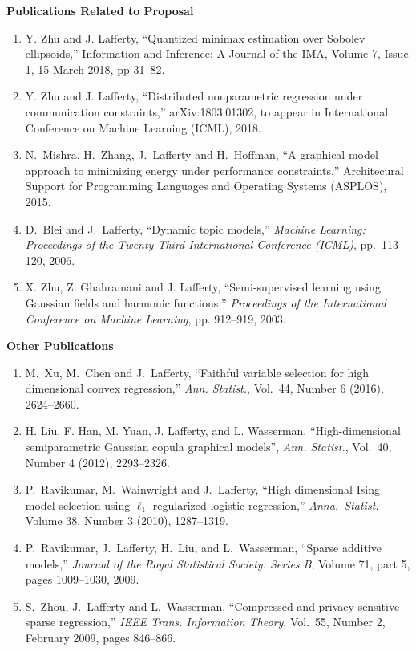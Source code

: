 \documentclass[pdftex,12pt]{article}
\begin{document}
\def\secskip{\vskip6pt}

\secskip{\bf Publications Related to Proposal}
\begin{enumerate}

\item Y. Zhu  and J. Lafferty, ``Quantized minimax estimation over Sobolev ellipsoids,''
Information and Inference: A Journal of the IMA, Volume 7, Issue 1, 15
March 2018, pp 31--82.

\item Y. Zhu  and J. Lafferty, ``Distributed nonparametric regression
  under communication constraints,'' arXiv:1803.01302, to appear in 
International Conference on Machine Learning (ICML), 2018.

\item N.~Mishra, H.~Zhang, J.~Lafferty and H.~Hoffman, ``A graphical
  model approach to  minimizing energy under performance constraints,''
  Architecural Support for Programming Languages and Operating
  Systems (ASPLOS), 2015.

\item D.~Blei and J.~Lafferty,
``Dynamic topic models,''
 {\it Machine Learning: Proceedings of the Twenty-Third International
  Conference (ICML)}, pp.~113--120, 2006.

\item X. Zhu, Z. Ghahramani and J. Lafferty, ``Semi-supervised
  learning using Gaussian fields and harmonic functions,'' {\it
    Proceedings of the International
    Conference on Machine Learning}, pp. 912--919, 2003.
\end{enumerate}


\secskip{\bf Other Publications}
\begin{enumerate}
\item M.~Xu, M.~Chen and J.~Lafferty, 
``Faithful variable selection for high dimensional convex
  regression,'' 
{\it Ann. Statist.}, Vol.~44, Number 6 (2016), 2624--2660.

\item H. Liu, F. Han, M. Yuan, J. Lafferty, and L. Wasserman,
``High-dimensional semiparametric Gaussian copula graphical models'',
{\it Ann. Statist.}, Vol.~40, Number 4 (2012), 2293--2326.

\item P.~Ravikumar, M.~Wainwright and J.~Lafferty, 
 ``High dimensional Ising model selection using $\ell_1$ regularized
 logistic regression,'' 
 {\it Anna.~Statist.} Volume 38, Number 3 (2010), 1287--1319.

\item P.~Ravikumar, J.~Lafferty, H.~Liu, and L.~Wasserman,
``Sparse additive models,'' {\it Journal of the Royal
  Statistical Society: Series B}, 
  Volume 71, part 5, pages 1009--1030, 2009.

\item
S.~Zhou, J.~Lafferty and L.~Wasserman, 
``Compressed and privacy sensitive sparse regression,''
{\it IEEE Trans. Information Theory}, Vol.~55, Number 2, February
2009, pages 846--866.
\end{enumerate}
\end{document}
